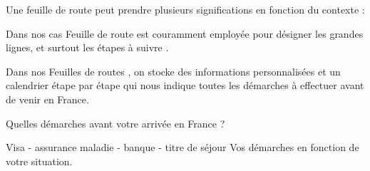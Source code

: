 Une feuille de route peut prendre plusieurs significations en fonction du contexte :

 Dans nos cas Feuille de route est couramment employée pour désigner les grandes lignes, et surtout les étapes à suivre .


Dans nos Feuilles de routes , on stocke des informations personnalisées et un calendrier étape par étape qui nous indique toutes les démarches à effectuer avant  de venir en France.
 
 Quelles démarches avant votre arrivée en France ?

Visa - assurance maladie - banque -  titre de séjour
Vos démarches en fonction de votre situation.

